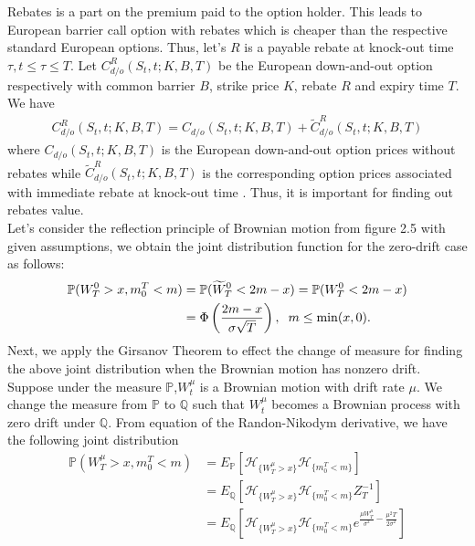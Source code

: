 \fontsize{11pt}{20pt}\selectfont Rebates is a part on the premium paid to the option holder. This leads to European barrier call option with rebates which is cheaper than the respective standard European options. Thus, let's $R$ is a payable rebate at knock-out time $\tau, t \leq \tau \leq T$. Let 
$C^R_{d/o}(S_t, t;K, B, T)$ be the European down-and-out option respectively
with common barrier $B$, strike price $K$, rebate $R$ and expiry time $T$. \\
We have
\begin{align*}
	C^R_{d/o}(S_t,t;K,B,T)=C_{d/o}(S_t,t;K,B,T)+\tilde{C}^R_{d/o}(S_t,t;K,B,T)
\end{align*} 
where $C_{d/o}(S_t,t;K,B,T)$ is the European down-and-out option prices without rebates while $\tilde{C}^R_{d/o}(S_t, t;K, B, T)$ is the corresponding option prices associated with immediate rebate at knock-out time \cite{Eric}. Thus, it is important for finding out rebates value. \\[0.5cm]
Let's consider the reflection principle of Brownian motion from figure 2.5 with given assumptions, we obtain the joint distribution function for the zero-drift case as follows:
\begin{align*}
	\mathbb{P}(W^0_T>x, m^T_0<m)&=\mathbb{P}(\widetilde{W}^0_T<2m-x)=\mathbb{P}(W^0_T<2m-x)\\
	&=\Phi \left(\dfrac{2m-x}{\sigma\sqrt{T}}\right), \hspace{0.2cm} m \leq \min(x, 0).  
\end{align*}
Next, we apply the Girsanov Theorem to effect the change of measure for finding
the above joint distribution when the Brownian motion has nonzero drift. Suppose
under the measure $\mathbb{P}$,$W^\mu_t$
is a Brownian motion with drift rate $\mu$. We change the
measure from $\mathbb{P}$ to $\mathbb{Q}$ such that $W_t^\mu$ becomes a Brownian process with zero drift
under 
$\mathbb{Q}$. From equation  of the Randon-Nikodym derivative, we have the following joint distribution \cite{Kwok}
\begin{align*}
	\mathbb{P}(W^\mu_T>x, m^T_0<m)&=E_\mathbb{P}\left[\mathcal{H}_{\displaystyle \{W^\mu_T>x\}} \mathcal{H}_{\displaystyle\{m^T_0<m\}}\right]\\
	&=E_\mathbb{Q}\left[\mathcal{H}_{\displaystyle \{W^\mu_T>x\}} \mathcal{H}_{\displaystyle\{m^T_0<m\}}Z^{-1}_T\right]\\
	&=E_\mathbb{Q}\left[\mathcal{H}_{\displaystyle \{W^\mu_T>x\}} \mathcal{H}_{\displaystyle\{m^T_0<m\}}e^{\frac{\mu W^\mu_T }{\sigma^2}-\frac{\mu^2 T}{2\sigma^2}}\right]
\end{align*}
